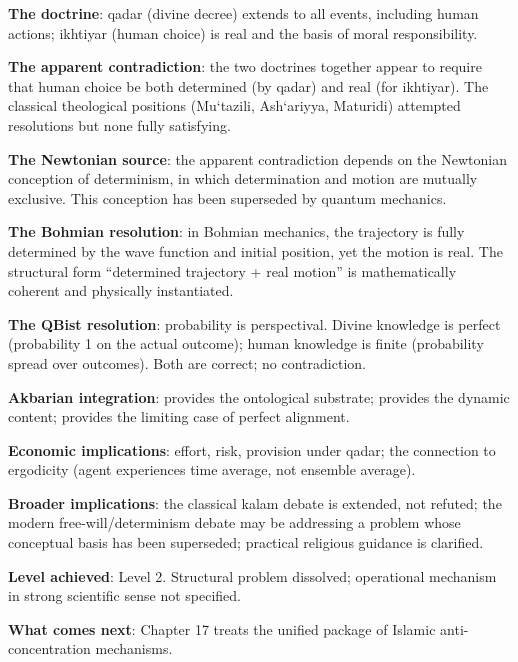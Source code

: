 \begin{summarybox}
\textbf{The doctrine}: qadar (divine decree) extends to all
events, including human actions; ikhtiyar (human choice) is real
and the basis of moral responsibility.

\textbf{The apparent contradiction}: the two doctrines together
appear to require that human choice be both determined (by qadar)
and real (for ikhtiyar). The classical theological positions
(Mu`tazili, Ash`ariyya, Maturidi) attempted resolutions but none
fully satisfying.

\textbf{The Newtonian source}: the apparent contradiction depends
on the Newtonian conception of determinism, in which determination
and motion are mutually exclusive. This conception has been
superseded by quantum mechanics.

\textbf{The Bohmian resolution}: in Bohmian mechanics, the
trajectory is fully determined by the wave function and initial
position, yet the motion is real. The structural form
``determined trajectory + real motion'' is mathematically
coherent and physically instantiated.

\textbf{The QBist resolution}: probability is perspectival.
Divine knowledge is perfect (probability 1 on the actual outcome);
human knowledge is finite (probability spread over outcomes). Both
are correct; no contradiction.

\textbf{Akbarian integration}:  provides the
ontological substrate;  provides the dynamic content;
 provides the limiting case of perfect
alignment.

\textbf{Economic implications}: effort, risk, provision under
qadar; the connection to ergodicity (agent experiences time
average, not ensemble average).

\textbf{Broader implications}: the classical kalam debate is
extended, not refuted; the modern free-will/determinism debate may
be addressing a problem whose conceptual basis has been
superseded; practical religious guidance is clarified.

\textbf{Level achieved}: Level 2. Structural problem dissolved;
operational mechanism in strong scientific sense not specified.

\textbf{What comes next}: Chapter 17 treats the unified package of
Islamic anti-concentration mechanisms.
\end{summarybox}

\cleardoublepage
